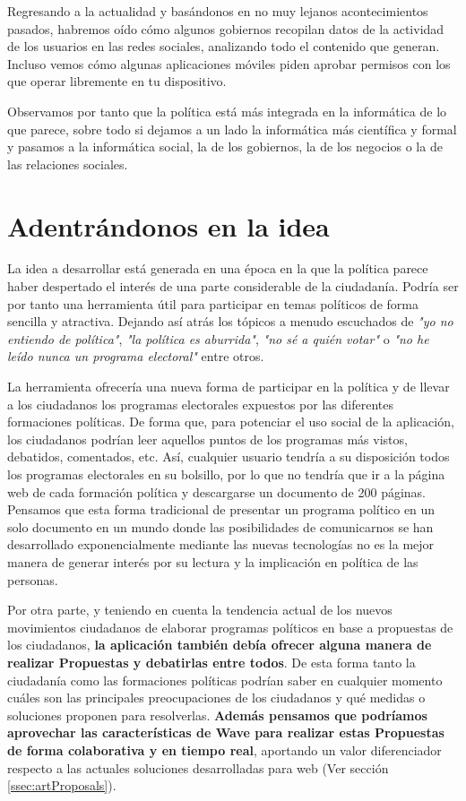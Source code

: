 Regresando a la actualidad y basándonos en no muy lejanos acontecimientos pasados, habremos oído cómo algunos gobiernos recopilan datos de la actividad de los usuarios en las redes sociales, analizando todo el contenido que generan. Incluso vemos cómo algunas aplicaciones móviles piden aprobar permisos con los que operar libremente en tu dispositivo.

Observamos por tanto que la política está más integrada en la informática de lo que parece, sobre todo si dejamos a un lado la informática más científica y formal y pasamos a la informática social, la de los gobiernos, la de los negocios o la de las relaciones sociales.


\section{Adentrándonos en la idea}

La idea a desarrollar está generada en una época en la que la política parece haber despertado el interés de una parte considerable de la ciudadanía. Podría ser por tanto una herramienta útil para participar en temas políticos de forma sencilla y atractiva. Dejando así atrás los tópicos a menudo escuchados de \textit{"yo no entiendo de política"}, \textit{"la política es aburrida"}, \textit{"no sé a quién votar"} o \textit{"no he leído nunca un programa electoral"} entre otros.

La herramienta ofrecería una nueva forma de participar en la política y de llevar a los ciudadanos los programas electorales expuestos por las diferentes formaciones políticas. De forma que, para potenciar el uso social de la aplicación, los ciudadanos podrían leer aquellos puntos de los programas más vistos, debatidos, comentados, etc. Así, cualquier usuario tendría a su disposición todos los programas electorales en su bolsillo, por lo que no tendría que ir a la página web de cada formación política y descargarse un documento de 200 páginas. Pensamos que esta forma tradicional de presentar un programa político en un solo documento en un mundo donde las posibilidades de comunicarnos se han desarrollado exponencialmente mediante las nuevas tecnologías no es la mejor manera de generar interés por su lectura y la implicación en política de las personas.

Por otra parte, y teniendo en cuenta la tendencia actual de los nuevos movimientos ciudadanos de elaborar programas políticos en base a propuestas de los ciudadanos, \textbf{la aplicación también debía ofrecer alguna manera de realizar Propuestas y debatirlas entre todos}. De esta forma tanto la ciudadanía como las formaciones políticas podrían saber en cualquier momento cuáles son las principales preocupaciones de los ciudadanos y qué medidas o soluciones proponen para resolverlas. \textbf{Además pensamos que podríamos aprovechar las características de Wave para realizar estas Propuestas de forma colaborativa y en tiempo real}, aportando un valor diferenciador respecto a las actuales soluciones desarrolladas para web (Ver sección \ref{ssec:artProposals}).

